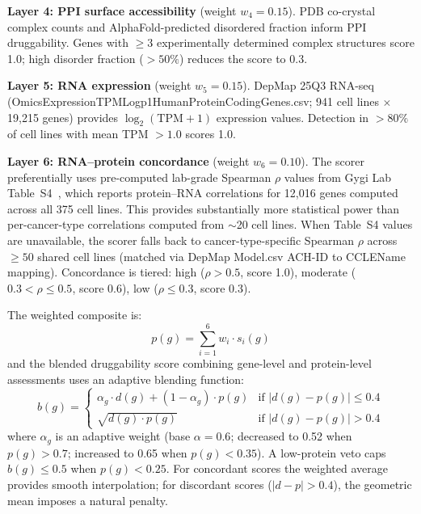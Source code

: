 \documentclass[11pt]{article}
\begin{document}
\textbf{Layer 4: PPI surface accessibility} (weight $w_4 = 0.15$). PDB co-crystal complex counts and AlphaFold-predicted disordered fraction inform PPI druggability. Genes with $\geq 3$ experimentally determined complex structures score 1.0; high disorder fraction ($> 50\%$) reduces the score to 0.3.

\textbf{Layer 5: RNA expression} (weight $w_5 = 0.15$). DepMap 25Q3 RNA-seq (OmicsExpressionTPMLogp1HumanProteinCodingGenes.csv; 941 cell lines $\times$ 19{,}215 genes) provides $\log_2(\text{TPM}+1)$ expression values. Detection in $> 80\%$ of cell lines with mean TPM $> 1.0$ scores 1.0.

\textbf{Layer 6: RNA--protein concordance} (weight $w_6 = 0.10$). The scorer preferentially uses pre-computed lab-grade Spearman $\rho$ values from Gygi Lab Table~S4~\cite{Nusinow2020}, which reports protein--RNA correlations for 12{,}016 genes computed across all 375 cell lines. This provides substantially more statistical power than per-cancer-type correlations computed from $\sim$20 cell lines. When Table~S4 values are unavailable, the scorer falls back to cancer-type-specific Spearman $\rho$ across $\geq 50$ shared cell lines (matched via DepMap Model.csv ACH-ID to CCLEName mapping). Concordance is tiered: high ($\rho > 0.5$, score 1.0), moderate ($0.3 < \rho \leq 0.5$, score 0.6), low ($\rho \leq 0.3$, score 0.3).

The weighted composite is:
\begin{equation}
p(g) = \sum_{i=1}^{6} w_i \cdot s_i(g)
\end{equation}
and the blended druggability score combining gene-level and protein-level assessments uses an adaptive blending function:
\begin{equation}
b(g) = \begin{cases}
\alpha_g \cdot d(g) + (1-\alpha_g) \cdot p(g) & \text{if } |d(g) - p(g)| \leq 0.4 \\
\sqrt{d(g) \cdot p(g)} & \text{if } |d(g) - p(g)| > 0.4
\end{cases}
\end{equation}
where $\alpha_g$ is an adaptive weight (base $\alpha = 0.6$; decreased to 0.52 when $p(g) > 0.7$; increased to 0.65 when $p(g) < 0.35$). A low-protein veto caps $b(g) \leq 0.5$ when $p(g) < 0.25$. For concordant scores the weighted average provides smooth interpolation; for discordant scores ($|d - p| > 0.4$), the geometric mean imposes a natural penalty.
\end{document}

